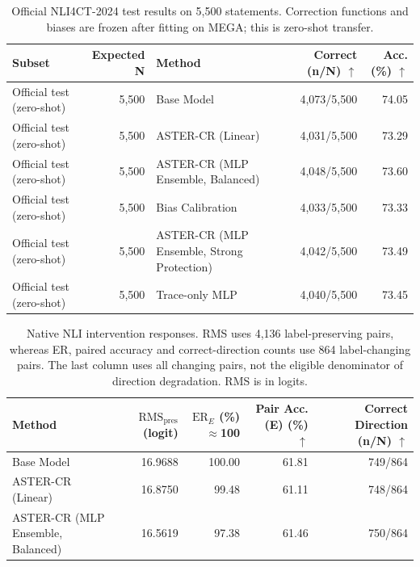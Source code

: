 \begin{table}[t]
\centering
\small
\setlength{\tabcolsep}{3pt}
\begin{tabularx}{\textwidth}{@{}>{\raggedright\arraybackslash}p{}r>{\raggedright\arraybackslash}Xrr@{}}
\toprule
Subset & Expected N & Method & \shortstack{Correct\\ (n/N) $\uparrow$} & \shortstack{Acc.\\ (\%) $\uparrow$} \\
\midrule
Official test (zero-shot) & 5,500 & Base Model & 4,073/5,500 & 74.05 \\
Official test (zero-shot) & 5,500 & ASTER-CR (Linear) & 4,031/5,500 & 73.29 \\
Official test (zero-shot) & 5,500 & ASTER-CR (MLP Ensemble, Balanced) & 4,048/5,500 & 73.60 \\
Official test (zero-shot) & 5,500 & Bias Calibration & 4,033/5,500 & 73.33 \\
Official test (zero-shot) & 5,500 & ASTER-CR (MLP Ensemble, Strong Protection) & 4,042/5,500 & 73.49 \\
Official test (zero-shot) & 5,500 & Trace-only MLP & 4,040/5,500 & 73.45 \\
\bottomrule
\end{tabularx}
\caption{Official NLI4CT-2024 test results on 5,500 statements. Correction functions and biases are frozen after fitting on MEGA; this is zero-shot transfer.}
\label{tab:aster-main-05}
\end{table}

\begin{table}[t]
\centering
\small
\setlength{\tabcolsep}{3pt}
\begin{tabularx}{\textwidth}{@{}>{\raggedright\arraybackslash}Xrrrr@{}}
\toprule
Method & \shortstack{$\mathrm{RMS}_{\mathrm{pres}}$\\ (logit)} & \shortstack{$\mathrm{ER}_{E}$\\ (\%) $\approx$100} & \shortstack{Pair Acc.\\ (E) (\%) $\uparrow$} & \shortstack{Correct Direction\\ (n/N) $\uparrow$} \\
\midrule
Base Model & 16.9688 & 100.00 & 61.81 & 749/864 \\
ASTER-CR (Linear) & 16.8750 & 99.48 & 61.11 & 748/864 \\
ASTER-CR (MLP Ensemble, Balanced) & 16.5619 & 97.38 & 61.46 & 750/864 \\
\bottomrule
\end{tabularx}
\caption{Native NLI intervention responses. RMS uses 4,136 label-preserving pairs, whereas ER, paired accuracy and correct-direction counts use 864 label-changing pairs. The last column uses all changing pairs, not the eligible denominator of direction degradation. RMS is in logits.}
\label{tab:aster-main-06}
\end{table}

